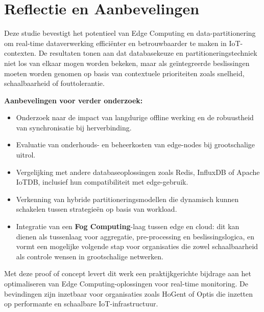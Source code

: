 \section{Reflectie en Aanbevelingen}

Deze studie bevestigt het potentieel van Edge Computing en data-partitionering om real-time dataverwerking efficiënter en betrouwbaarder te maken in IoT-contexten. De resultaten tonen aan dat databasekeuze en partitioneringstechniek niet los van elkaar mogen worden bekeken, maar als geïntegreerde beslissingen moeten worden genomen op basis van contextuele prioriteiten zoals snelheid, schaalbaarheid of fouttolerantie.

\textbf{Aanbevelingen voor verder onderzoek:}
\begin{itemize}
    \item Onderzoek naar de impact van langdurige offline werking en de robuustheid van synchronisatie bij herverbinding.
    \item Evaluatie van onderhouds- en beheerkosten van edge-nodes bij grootschalige uitrol.
    \item Vergelijking met andere databaseoplossingen zoals Redis, InfluxDB of Apache IoTDB, inclusief hun compatibiliteit met edge-gebruik.
    \item Verkenning van hybride partitioneringsmodellen die dynamisch kunnen schakelen tussen strategieën op basis van workload.
    \item Integratie van een \textbf{Fog Computing}-laag tussen edge en cloud: dit kan dienen als tussenlaag voor aggregatie, pre-processing en beslissingslogica, en vormt een mogelijke volgende stap voor organisaties die zowel schaalbaarheid als controle wensen in grootschalige netwerken.
\end{itemize}

Met deze proof of concept levert dit werk een praktijkgerichte bijdrage aan het optimaliseren van Edge Computing-oplossingen voor real-time monitoring. De bevindingen zijn inzetbaar voor organisaties zoals HoGent of Optis die inzetten op performante en schaalbare IoT-infrastructuur.
